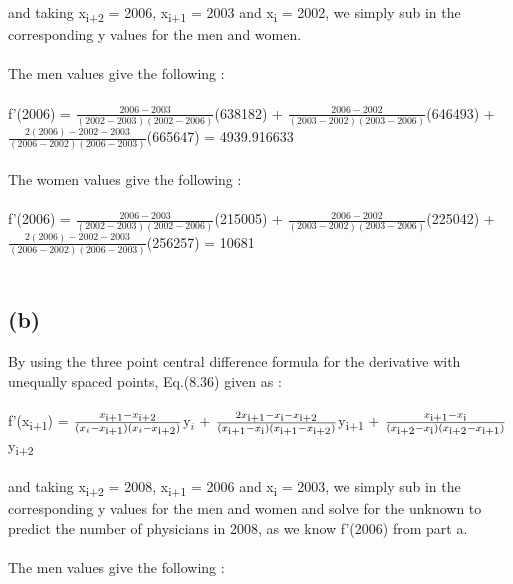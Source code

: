 \documentclass{article}
\begin{document}
	and taking x\textsubscript{i+2} = 2006, x\textsubscript{i+1} = 2003 and x\textsubscript{i} = 2002, we simply sub in the corresponding y values for the men and women.\\\\
	The men values give the following :\\\\
	
	f'(2006) = $\frac{2006 - 2003}{(2002-2003)(2002-2006)}$(638182)
	+
	$\frac{2006 - 2002}{(2003-2002)(2003-2006)}$(646493)
	+
	$\frac{2(2006) - 2002 - 2003}{(2006-2002)(2006-2003)}$(665647) = 4939.916633\\\\
	
	The women values give the following :\\\\
	
	f'(2006) = $\frac{2006 - 2003}{(2002-2003)(2002-2006)}$(215005)
	+
	$\frac{2006 - 2002}{(2003-2002)(2003-2006)}$(225042)
	+
	$\frac{2(2006) - 2002 - 2003}{(2006-2002)(2006-2003)}$(256257) = 10681\\\\
	
	\subsection*{(b)}
	By using the three point central difference formula for the derivative with unequally spaced points, Eq.(8.36) given as :\\\\
	
	f'(x\textsubscript{i+1}) = $\frac{x\textsubscript{i+1} - x\textsubscript{i+2}}{(x_i - x\textsubscript{i+1})
		(x_i - x\textsubscript{i+2})}$y$_i$
	+
	$\frac{2x\textsubscript{i+1} - x\textsubscript{i} - x\textsubscript{i+2}}{(x\textsubscript{i+1} - x\textsubscript{i})
		(x\textsubscript{i+1} - x\textsubscript{i+2})}$y\textsubscript{i+1}
	+
	$\frac{x\textsubscript{i+1} - x\textsubscript{i}}{(x\textsubscript{i+2} - x\textsubscript{i})
		(x\textsubscript{i+2} - x\textsubscript{i+1})}$y\textsubscript{i+2}\\\\
	
	and taking x\textsubscript{i+2} = 2008, x\textsubscript{i+1} = 2006 and x\textsubscript{i} = 2003, we simply sub in the corresponding y values for the men and women and solve for the unknown to predict the number of physicians in 2008, as we know f'(2006) from part a.\\\\
	The men values give the following :\\\\
	
\end{document}
